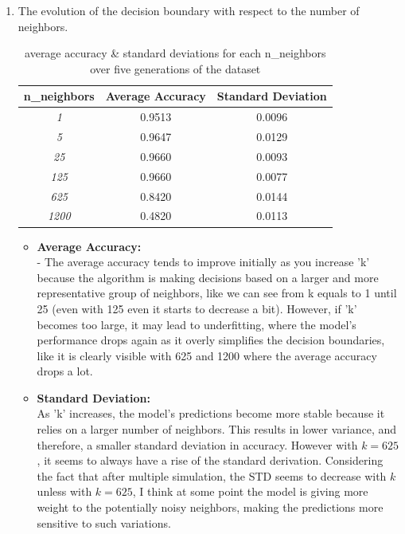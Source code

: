 \documentclass[acmconf,nonacm=true]{acmart}
\begin{document}
\begin{enumerate}
\begin{enumerate}
    \end{enumerate}
    \item 
    The evolution of the decision boundary with respect to the number of neighbors. \\
    \begin{table}[h]
    \centering
    \begin{tabular}{|c|c|c|}
        \hline
        \textbf{n\_neighbors} & \textbf{Average Accuracy} & \textbf{Standard Deviation} \\
        \hline
        \textit{1} & 0.9513 & 0.0096 \\
        \textit{5} & 0.9647 & 0.0129 \\
        \textit{25} & 0.9660 & 0.0093 \\
        \textit{125} & 0.9660 & 0.0077 \\
        \textit{625} & 0.8420 & 0.0144 \\
        \textit{1200} & 0.4820 & 0.0113 \\
        \hline
    \end{tabular}
    \caption{average accuracy \& standard deviations for each n\_neighbors over five generations of the dataset}
    \label{tab:your_table_label}
    \end{table}
    \begin{itemize}
        \item \textbf{Average Accuracy:} \\
        - The average accuracy tends to improve initially as you increase 'k' because the algorithm is making decisions based on a larger and more representative group of neighbors, like we can see from k equals to 1 until 25 (even with 125 even it starts to decrease a bit). However, if 'k' becomes too large, it may lead to underfitting, where the model's performance drops again as it overly simplifies the decision boundaries, like it is clearly visible with 625 and 1200 where the average accuracy drops a lot.
        \item \textbf{Standard Deviation:} \\
         As 'k' increases, the model's predictions become more stable because it relies on a larger number of neighbors. This results in lower variance, and therefore, a smaller standard deviation in accuracy. However with $ k = 625$, it seems to always have a rise of the standard derivation. Considering the fact that after multiple simulation, the STD seems to decrease with $k$ unless with $k = 625$, I think at some point  the model is giving more weight to the potentially noisy neighbors, making the predictions more sensitive to such variations.
    \end{itemize}

    
\end{enumerate}
\end{document}
